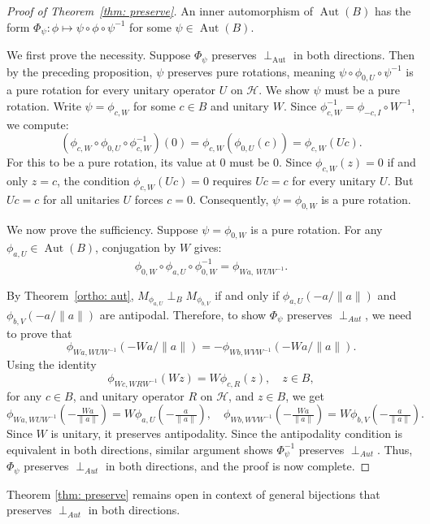 \documentclass[12pt]{amsart}
\theoremstyle{definition}
\renewcommand{\H}{\mathcal{H}}
\newcommand{\Aut}{\operatorname{Aut}}
\begin{document}
\begin{proof}[Proof of Theorem~\ref{thm: preserve}]
An inner automorphism of $\Aut(B)$ has the form $\Phi_\psi:\phi\mapsto\psi\circ\phi\circ\psi^{-1}$ for some $\psi\in\Aut(B)$.
 
\medskip
 
\noindent We first prove the necessity. Suppose $\Phi_\psi$ preserves $\perp_{\Aut}$ in both directions. Then by the preceding proposition, $\psi$ preserves pure rotations, meaning $\psi\circ\phi_{0,U}\circ\psi^{-1}$ is a pure rotation for every unitary operator $U$ on $\H$. We show $\psi$ must be a pure rotation. Write $\psi = \phi_{c,W}$ for some $c\in B$ and unitary $W$. Since $\phi_{c,W}^{-1} = \phi_{-c,I}\circ W^{-1}$, we compute:
\[
(\phi_{c,W}\circ\phi_{0,U}\circ\phi_{c,W}^{-1})(0)
= \phi_{c,W}(\phi_{0,U}(c))
= \phi_{c,W}(Uc).
\]
For this to be a pure rotation, its value at $0$ must be $0$. Since $\phi_{c,W}(z) = 0$ if and only $z = c$, the condition $\phi_{c,W}(Uc) = 0$ requires $Uc = c$ for every unitary $U$. But $Uc = c$ for all unitaries $U$ forces $c = 0$. Consequently, $\psi = \phi_{0,W}$ is a pure rotation.
 
\medskip
 
\noindent We now prove the sufficiency. Suppose $\psi = \phi_{0,W}$ is a pure rotation. For any $\phi_{a,U}\in\Aut(B)$, conjugation by $W$ gives:
\[
\phi_{0,W}\circ\phi_{a,U}\circ\phi_{0,W}^{-1} = \phi_{Wa,\,WUW^{-1}}.
\]

 
\medskip
 
\noindent By Theorem~\ref{ortho: aut}, $M_{\phi_{a,U}}\perp_B M_{\phi_{b,V}}$ if and only if $\phi_{a,U}(-a/\|a\|)$ and $\phi_{b,V}(-a/\|a\|)$ are antipodal. Therefore, to show $\Phi_\psi$ preserves $\perp_{Aut}$, we need to prove that 
\[
\phi_{Wa,WUW^{-1}}(-Wa/\|a\|)=-\phi_{Wb,WVW^{-1}}(-Wa/\|a\|).
\]
Using the identity 
\[
\phi_{Wc,WRW^{-1}}(Wz) = W\phi_{c,R}(z), \quad z\in B,
\]
for any $c\in B$, and unitary operator $R$ on $\H$, and $z\in B$, we get
\[
\phi_{Wa,WUW^{-1}}\!\left(-\tfrac{Wa}{\|a\|}\right) = W\phi_{a,U}\!\left(-\tfrac{a}{\|a\|}\right),
\quad
\phi_{Wb,WVW^{-1}}\!\left(-\tfrac{Wa}{\|a\|}\right) = W\phi_{b,V}\!\left(-\tfrac{a}{\|a\|}\right).
\]
Since $W$ is unitary, it preserves antipodality. Since the antipodality condition is equivalent in both directions, similar argument shows $\Phi_\psi^{-1}$ preserves $\perp_{Aut}$. Thus, $\Phi_\psi$ preserves $\perp_{Aut}$ in both directions, and the proof is now complete.
\end{proof}

\noindent Theorem \ref{thm: preserve} remains open in context of general bijections that preserves $\perp_{Aut}$ in both directions.
\end{document}
